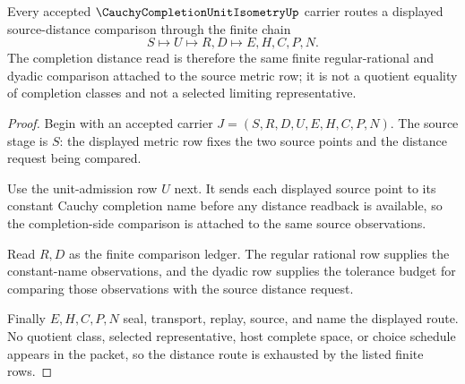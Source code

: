 \begin{theorem}
\label{thm:cauchy-completion-unit-isometry-distance-route}
Every accepted $\CauchyCompletionUnitIsometryUp$ carrier routes a displayed
source-distance comparison through the finite chain
$$
S \longmapsto U \longmapsto R,D \longmapsto E,H,C,P,N .
$$
The completion distance read is therefore the same finite regular-rational and
dyadic comparison attached to the source metric row; it is not a quotient
equality of completion classes and not a selected limiting representative.
\end{theorem}
\begin{proof}
Begin with an accepted carrier $J=(S,R,D,U,E,H,C,P,N)$. The source stage is
$S$: the displayed metric row fixes the two source points and the distance
request being compared.

Use the unit-admission row $U$ next. It sends each displayed source point to
its constant Cauchy completion name before any distance readback is available,
so the completion-side comparison is attached to the same source observations.

Read $R,D$ as the finite comparison ledger. The regular rational row supplies
the constant-name observations, and the dyadic row supplies the tolerance
budget for comparing those observations with the source distance request.

Finally $E,H,C,P,N$ seal, transport, replay, source, and name the displayed
route. No quotient class, selected representative, host complete space, or
choice schedule appears in the packet, so the distance route is exhausted by
the listed finite rows.
\end{proof}

